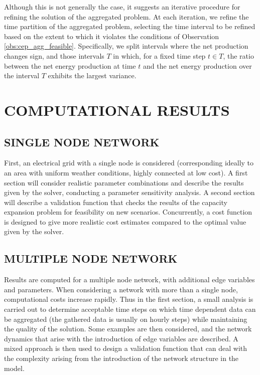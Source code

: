 {{Although this is not generally the case, it suggests an iterative procedure for refining the solution of the aggregated problem. At each iteration, we refine the time partition of the aggregated problem, selecting the time interval to be refined based on the extent to which it violates the conditions of Observation \ref{obs:cep_agg_feasible}. Specifically, we split intervals where the net production changes sign, and those intervals \(T\) in which, for a fixed time step \(t \in T\), the ratio between the net energy production at time \(t\) and the net energy production over the interval \(T\) exhibits the largest variance.

}


\section{COMPUTATIONAL RESULTS}
\subsection{SINGLE NODE NETWORK}
First, an electrical grid with a single node is considered (corresponding ideally to an area with uniform
weather conditions, highly connected at low cost). A first section will consider realistic parameter
combinations and describe the results given by the solver, conducting a parameter sensitivity analysis. A
second section will describe a validation function that checks the results of the capacity expansion
problem for feasibility on new scenarios. Concurrently, a cost function is designed to give more realistic
cost estimates compared to the optimal value given by the solver.
\subsection{MULTIPLE NODE NETWORK}
Results are computed for a multiple node network, with additional edge variables and parameters. When
considering a network with more than a single node, computational costs increase rapidly. Thus in the
first section, a small analysis is carried out to determine acceptable time steps on which time dependent
data can be aggregated (the gathered data is usually on hourly steps) while maintaining the quality of the
solution. Some examples are then considered, and the network dynamics that arise with the introduction
of edge variables are described. A mixed approach is then used to design a validation function that can
deal with the complexity arising from the introduction of the network structure in the model.
}
